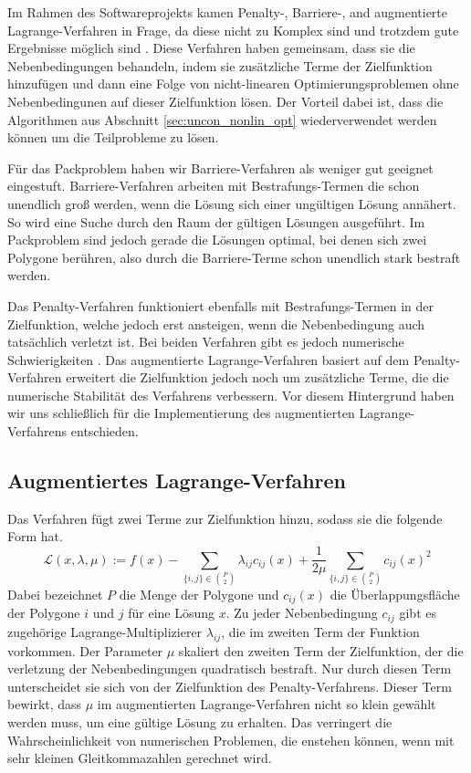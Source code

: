 \documentclass[runningheads,a4paper]{llncs}
\begin{document}
Im Rahmen des Softwareprojekts kamen Penalty-, Barriere-, and augmentierte Lagrange-Verfahren in Frage, da diese nicht zu Komplex sind und trotzdem gute Ergebnisse möglich sind \cite{nocedal1999numerical}. Diese Verfahren haben gemeinsam, dass sie die Nebenbedingungen behandeln, indem sie zusätzliche Terme der Zielfunktion hinzufügen und dann eine Folge von nicht-linearen Optimierungsproblemen ohne Nebenbedingunen auf dieser Zielfunktion lösen. Der Vorteil dabei ist, dass die Algorithmen aus Abschnitt \ref{sec:uncon_nonlin_opt} wiederverwendet werden können um die Teilprobleme zu lösen.

Für das Packproblem haben wir Barriere-Verfahren als weniger gut geeignet eingestuft. Barriere-Verfahren arbeiten mit Bestrafungs-Termen die schon unendlich groß werden, wenn die Lösung sich einer ungültigen Lösung annähert. So wird eine Suche durch den Raum der gültigen Lösungen ausgeführt. Im Packproblem sind jedoch gerade die Lösungen optimal, bei denen sich zwei Polygone berühren, also durch die Barriere-Terme schon unendlich stark bestraft werden.

Das Penalty-Verfahren funktioniert ebenfalls mit Bestrafungs-Termen in der Zielfunktion, welche jedoch erst ansteigen, wenn die Nebenbedingung auch tatsächlich verletzt ist. Bei beiden Verfahren gibt es jedoch numerische Schwierigkeiten \cite{nocedal1999numerical}. Das augmentierte Lagrange-Verfahren basiert auf dem Penalty-Verfahren erweitert die Zielfunktion jedoch noch um zusätzliche Terme, die die numerische Stabilität des Verfahrens verbessern. Vor diesem Hintergrund haben wir uns schließlich für die Implementierung des augmentierten Lagrange-Verfahrens entschieden.

\subsection{Augmentiertes Lagrange-Verfahren}
Das Verfahren fügt zwei Terme zur Zielfunktion hinzu, sodass sie die folgende Form hat.
\begin{equation}
\label{eq:aug_lagrangian}
\mathcal{L}(x,\lambda,\mu) := f(x) - \sum_{\{i,j\}\in {P \choose 2}} \lambda_{ij} c_{ij}(x) + \frac{1}{2\mu}\sum_{\{i,j\}\in {P \choose 2}} c_{ij}(x)^2
\end{equation}
Dabei bezeichnet $P$ die Menge der Polygone und $c_{ij}(x)$ die Überlappungsfläche der Polygone $i$ und $j$ für eine Lösung $x$. Zu jeder Nebenbedingung $c_{ij}$ gibt es zugehörige Lagrange-Multiplizierer $\lambda_{ij}$, die im zweiten Term der Funktion vorkommen. Der Parameter $\mu$ skaliert den zweiten Term der Zielfunktion, der die verletzung der Nebenbedingungen quadratisch bestraft. Nur durch diesen Term unterscheidet sie sich von der Zielfunktion des Penalty-Verfahrens. Dieser Term bewirkt, dass $\mu$ im augmentierten Lagrange-Verfahren nicht so klein gewählt werden muss, um eine gültige Lösung zu erhalten. Das verringert die Wahrscheinlichkeit von numerischen Problemen, die enstehen können, wenn mit sehr kleinen Gleitkommazahlen gerechnet wird.
\end{document}
